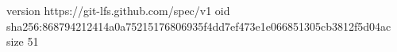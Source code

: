 version https://git-lfs.github.com/spec/v1
oid sha256:868794212414a0a75215176806935f4dd7ef473e1e066851305cb3812f5d04ac
size 51
